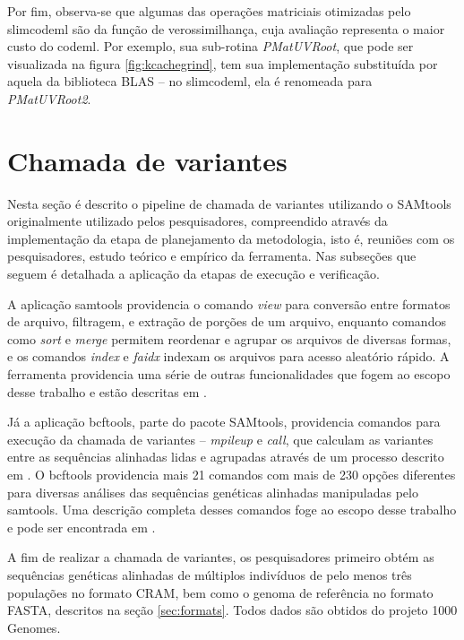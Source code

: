 \documentclass[cic,tc]{iiufrgs}
\begin{document}
Por fim, observa-se que algumas das operações matriciais otimizadas pelo
slimcodeml são da função de verossimilhança, cuja avaliação representa o maior
custo do codeml. Por exemplo, sua sub-rotina \textit{PMatUVRoot}, que pode ser
visualizada na figura \ref{fig:kcachegrind}, tem sua implementação substituída
por aquela da biblioteca BLAS -- no slimcodeml, ela é renomeada para
\textit{PMatUVRoot2}.

\section{Chamada de variantes}
\label{sec:SAMtools}

Nesta seção é descrito o pipeline de chamada de variantes utilizando o SAMtools
originalmente utilizado pelos pesquisadores, compreendido através da
implementação da etapa de planejamento da metodologia, isto é, reuniões com os
pesquisadores, estudo teórico e empírico da ferramenta. Nas subseções que
seguem é detalhada a aplicação da etapas de execução e verificação.

A aplicação samtools providencia o comando \textit{view} para conversão entre
formatos de arquivo, filtragem, e extração de porções de um arquivo, enquanto
comandos como \textit{sort} e \textit{merge} permitem reordenar e agrupar os
arquivos de diversas formas, e os comandos \textit{index} e \textit{faidx}
indexam os arquivos para acesso aleatório rápido. A ferramenta providencia uma
série de outras funcionalidades que fogem ao escopo desse trabalho e estão
descritas em \cite{danecek2021twelve}.

Já a aplicação bcftools, parte do pacote SAMtools, providencia comandos para
execução da chamada de variantes -- \textit{mpileup} e \textit{call}, que
calculam as variantes entre as sequências alinhadas lidas e agrupadas através
de um processo descrito em \cite{li2011improving}. O bcftools providencia mais
21 comandos com mais de 230 opções diferentes para diversas análises das
sequências genéticas alinhadas manipuladas pelo samtools. Uma descrição
completa desses comandos foge ao escopo desse trabalho e pode ser encontrada em
\cite{danecek2021twelve}.

A fim de realizar a chamada de variantes, os pesquisadores primeiro obtém as
sequências genéticas alinhadas de múltiplos indivíduos de pelo menos três
populações no formato CRAM, bem como o genoma de referência no formato FASTA,
descritos na seção \ref{sec:formats}. Todos dados são obtidos do projeto 1000
Genomes.
\end{document}
